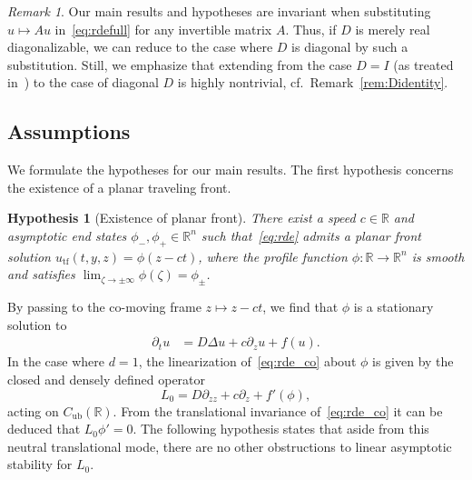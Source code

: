 \documentclass[12pt,oneside,a4paper,reqno]{amsart}
\numberwithin{equation}{section}
\newtheorem{hypothesis}{Hypothesis}
\theoremstyle{definition}
\theoremstyle{remark}
\newtheorem{remark}[theorem]{Remark}
\newcommand{\bbR}{{\mathbb R}}
\newcommand{\Cub}{{C_{\mathrm{ub}}}}
\begin{document}
\begin{remark}
    \label{rem:Ddiagonal}
    Our main results and hypotheses are invariant when substituting $u \mapsto A u$ in~\eqref{eq:rdefull} for any invertible matrix $A$.
    Thus, if $D$ is merely real diagonalizable, we can reduce to the case where $D$ is diagonal by such a substitution.
    Still, we emphasize that extending from the case $D = I$ (as treated in~\cite{kapitula_multidimensional_1997}) to the case of diagonal $D$ is highly nontrivial, cf.\ Remark~\ref{rem:Didentity}.
\end{remark}


\subsection{Assumptions} \label{subsec:assumptions} We formulate the hypotheses for our main results. The first hypothesis concerns the existence of a planar traveling front.
\begin{hypothesis}[Existence of planar front]
    \label{hyp:wave}
There exist a speed $c \in \bbR$ and asymptotic end states $\phi_-,\phi_+ \in \bbR^n$ such that~\eqref{eq:rde} admits a planar front solution $u_{\mathrm{tf}}(t,y,z) = \phi(z-ct)$, where the profile function $\phi \colon \bbR \to \bbR^n$ is smooth and satisfies $\lim_{\zeta \to \pm \infty} \phi(\zeta) = \phi_\pm$.
\end{hypothesis}

By passing to the co-moving frame $z \mapsto z-ct$, we find that $\phi$ is a stationary solution to
\begin{align} 	\label{eq:rde_co}
\partial_t u &= D\Delta u + c \partial_z u + f(u).
\end{align}
In the case where $d = 1$, the linearization of~\eqref{eq:rde_co} about $\phi$ is given by the closed and densely defined operator
\begin{equation}
    \label{eq:1dlinearization}
    L_0 = D \partial_{zz} + c \partial_z + f'(\phi),
\end{equation}
acting on $\Cub(\bbR)$.
From the translational invariance of~\eqref{eq:rde_co} it can be deduced that $L_0 \phi' = 0$.
The following hypothesis states that aside from this neutral translational mode, there are no other obstructions to linear asymptotic stability for $L_0$.
\end{document}

